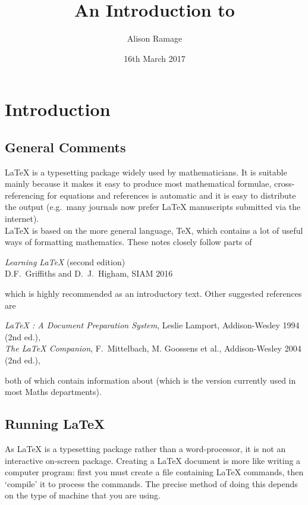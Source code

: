 \documentclass[11pt]{article}
\title{An Introduction to \lx}
\author{Alison Ramage}
\date{16th March 2017}
\newcommand{\bc}{\begin{center}}
\newcommand{\ec}{\end{center}}
\newcommand{\lx}{{\LaTeX} }
\begin{document}
\maketitle

\section{\label{start}Introduction}
\subsection{General Comments}

\lx is a typesetting package widely used by mathematicians. It is
suitable mainly because it makes it easy to produce most
mathematical formulae, cross-referencing for equations and
references is automatic and it is easy to distribute the output
(e.g.\ many journals now prefer \lx manuscripts submitted via the
internet).\\

\lx is based on the more general language, \TeX, which contains a lot of
useful ways of formatting mathematics.
These notes closely follow parts of
\bc
\textit{Learning \lx} (second edition)\\
D.F.\ Griffiths and D.\ J.\ Higham, SIAM 2016
\ec
which is highly recommended as an introductory text.
Other suggested references are
\bc
\textit{\lx: A Document Preparation System}, Leslie Lamport,
Addison-Wesley 1994 (2nd ed.),\\
\textit{The \lx Companion},
F.\ Mittelbach, M. Goossens et al., Addison-Wesley 2004 (2nd ed.),
\ec
both of which contain information about \LaTeXe (which is the
version currently used in most Maths departments). 

\subsection{Running \lx}
As \lx is a typesetting package rather than a word-processor, it
is not an interactive on-screen package. Creating a \lx document
is more like writing a computer program: first you must create a
file containing \lx commands, then `compile' it to process the commands.
The precise method of doing this depends on the type of machine 
that you are using. 
\end{document}

